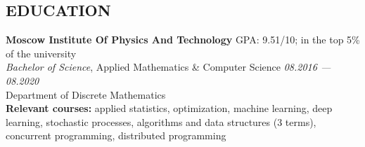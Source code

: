 \documentclass[11pt]{res}
\newcommand{\vmarginsmall}{\vspace{0.1cm}}
\begin{document}
\begin{resume}
\section{EDUCATION}
\vmarginsmall
\textbf{Moscow Institute Of Physics And Technology} \hfill GPA: 9.51/10; in the top 5\% of the university\\
{\sl Bachelor of Science}, Applied Mathematics \& Computer Science \hfill \textit{08.2016 — 08.2020} \\
Department of Discrete Mathematics\\
\textbf{Relevant courses:} applied statistics, optimization, machine learning, deep learning, stochastic processes, algorithms and data structures (3 terms), concurrent programming, distributed programming

\end{resume}
\end{document}
